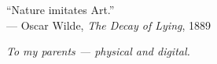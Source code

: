 \cleardoublepage
\thispagestyle{empty}

\vspace*{3cm}

\begin{raggedleft}
``Nature imitates Art.'' \\
--- Oscar Wilde, \textit{The Decay of Lying}, 1889 \\
\end{raggedleft}

\vspace{4cm+\baselineskip}

\begin{center}
\textit{To my parents --- physical and digital.}
\end{center}
